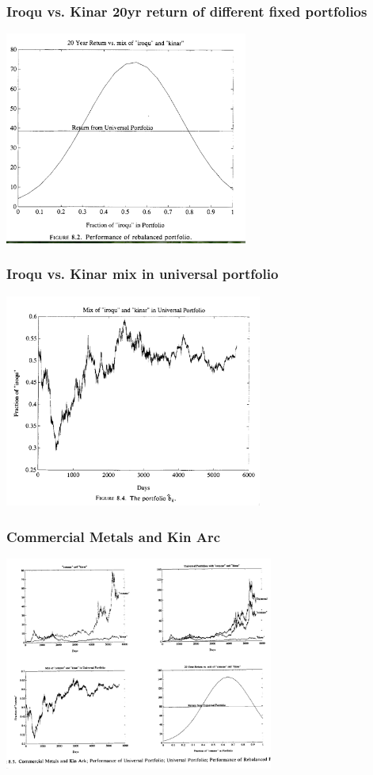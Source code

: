 \documentclass{beamer}
\begin{document}
\begin{small}
\begin{frame}
\frametitle{Iroqu vs. Kinar 20yr return of different fixed portfolios}

\includegraphics[height=7cm]{figures/Cursor_and_Universal_Portfolios_pdf-4.png}
\end{frame}

\begin{frame}
\frametitle{Iroqu vs. Kinar mix in universal portfolio}

\includegraphics[height=7cm]{figures/Cursor_and_Universal_Portfolios_pdf.png}
\end{frame}

\begin{frame}
\frametitle{Commercial Metals and Kin Arc}
\includegraphics[height=7cm]{figures/CommercialMetals&KinArc.png}
\end{frame}


\end{small}
\end{document}

